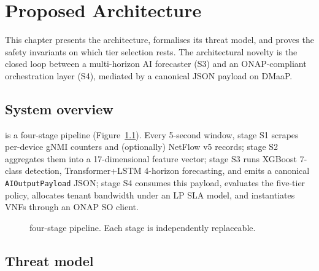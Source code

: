 \chapter{Proposed Architecture}
\label{ch:architecture}

This chapter presents the \padonap{} architecture, formalises its
threat model, and proves the safety invariants on which tier selection
rests. The architectural novelty is the closed loop between a multi-horizon
AI forecaster (S3) and an ONAP-compliant orchestration layer (S4), mediated
by a canonical JSON payload on DMaaP.

\section{System overview}
\label{sec:arch-overview}

\padonap{} is a four-stage pipeline (Figure~\ref{fig:arch}). Every 5-second
window, stage S1 scrapes per-device gNMI counters and (optionally) NetFlow
v5 records; stage S2 aggregates them into a 17-dimensional feature vector;
stage S3 runs XGBoost 7-class detection, Transformer+LSTM 4-horizon
forecasting, and emits a canonical \texttt{AIOutputPayload} JSON; stage S4
consumes this payload, evaluates the five-tier policy, allocates tenant
bandwidth under an LP SLA model, and instantiates VNFs through an ONAP SO
client.

\begin{figure}[H]
\centering
{}
\caption{\padonap{} four-stage pipeline. Each stage is independently replaceable.}
\label{fig:arch}
\end{figure}

\section{Threat model}
\label{sec:threat-model}


